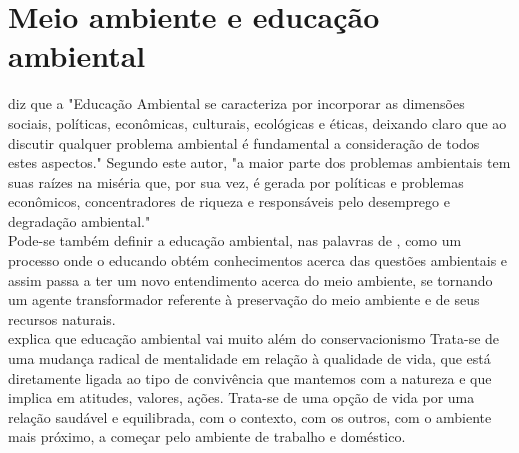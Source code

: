 \section{Meio ambiente e educação ambiental}

  diz que a "Educação Ambiental se caracteriza por
incorporar as dimensões sociais, políticas, econômicas,
culturais, ecológicas e éticas, deixando claro que ao discutir
qualquer problema ambiental é fundamental a consideração
de todos estes aspectos." Segundo este autor, "a maior parte
dos problemas ambientais tem suas raízes na miséria que,
por sua vez, é gerada por políticas e problemas econômicos,
concentradores de riqueza e responsáveis pelo desemprego
e degradação ambiental."\\

Pode-se também definir a educação ambiental, nas palavras de , como um processo
onde o educando obtém conhecimentos acerca das
questões ambientais e assim passa a ter um novo
entendimento acerca do meio ambiente, se tornando um
agente transformador referente à preservação do meio
ambiente e de seus recursos naturais. \\

 explica que educação ambiental vai muito além do conservacionismo
Trata-se de uma mudança radical de mentalidade em
relação à qualidade de vida, que está diretamente ligada
ao tipo de convivência que mantemos com a natureza e
que implica em atitudes, valores, ações. Trata-se de uma
opção de vida por uma relação saudável e equilibrada,
com o contexto, com os outros, com o ambiente mais
próximo, a começar pelo ambiente de trabalho e
doméstico.\\

